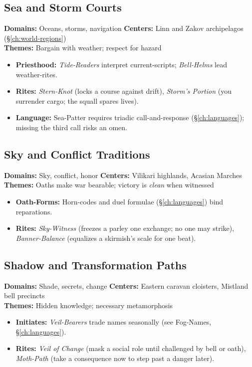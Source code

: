 \begin{multicols}{2}
\subsection*{Sea and Storm Courts}
\textbf{Domains:} Oceans, storms, navigation \quad
\textbf{Centers:} Linn and Zakov archipelagos (\S\ref{ch:world-regions}) \\
\textbf{Themes:} Bargain with weather; respect for hazard
\begin{itemize}
  \item \textbf{Priesthood:} \emph{Tide-Readers} interpret current-scripts; \emph{Bell-Helms} lead weather-rites. 
  \item \textbf{Rites:} \emph{Stern-Knot} (locks a course against drift), \emph{Storm’s Portion} (you surrender cargo; the squall spares lives).
  \item \textbf{Language:} Sea-Patter requires triadic call-and-response (\S\ref{ch:languages}); missing the third call risks an omen. 
\end{itemize}

\subsection*{Sky and Conflict Traditions}
\textbf{Domains:} Sky, conflict, honor \quad
\textbf{Centers:} Vilikari highlands, Acasian Marches \\
\textbf{Themes:} Oaths make war bearable; victory is \emph{clean} when witnessed
\begin{itemize}
  \item \textbf{Oath-Forms:} Horn-codes and duel formulae (\S\ref{ch:languages}) bind reparations. 
  \item \textbf{Rites:} \emph{Sky-Witness} (freezes a parley one exchange; no one may strike), \emph{Banner-Balance} (equalizes a skirmish’s scale for one beat).
\end{itemize}

\subsection*{Shadow and Transformation Paths}
\textbf{Domains:} Shade, secrets, change \quad
\textbf{Centers:} Eastern caravan cloisters, Mistland bell precincts \\
\textbf{Themes:} Hidden knowledge; necessary metamorphosis
\begin{itemize}
  \item \textbf{Initiates:} \emph{Veil-Bearers} trade names seasonally (see Fog-Names, \S\ref{ch:languages}). 
  \item \textbf{Rites:} \emph{Veil of Change} (mask a social role until challenged by bell or oath), \emph{Moth-Path} (take a consequence now to step past a danger later).
\end{itemize}


\end{multicols}

